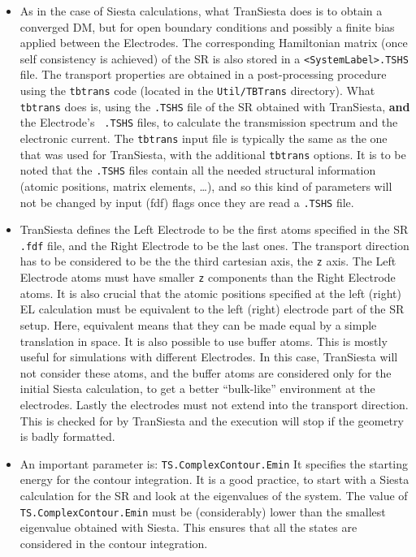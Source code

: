 \documentclass[11pt]{article}
\begin{document}
\begin{itemize}
\item
As in the case of {\sc Siesta} calculations, what {\sc TranSiesta}
does is to obtain a converged DM, but for open boundary conditions and
possibly a finite bias applied between the Electrodes. The
corresponding Hamiltonian matrix (once self consistency is achieved)
of the SR is also stored in a {\tt <SystemLabel>.TSHS} file. The
transport properties are obtained in a post-processing procedure using
the {\tt tbtrans} code (located in the {\tt Util/TBTrans}
directory). What {\tt tbtrans} does is, using the {\tt .TSHS} file of
the SR obtained with {\sc TranSiesta}, {\bf and} the Electrode's {\tt
  .TSHS} files, to calculate the transmission spectrum and the
electronic current. The {\tt tbtrans} input file is typically the same
as the one that was used for {\sc TranSiesta}, with the additional
{\tt tbtrans} options. It is to be noted that the {\tt .TSHS} files
contain all the needed structural information (atomic positions,
matrix elements, \ldots), and so this kind of parameters will not be
changed by input (fdf) flags once they are read a {\tt .TSHS} file.

\item
{\sc TranSiesta} defines the Left Electrode to be the first atoms
specified in the SR {\tt .fdf} file, and the Right Electrode to be the
last ones. The transport direction has to be considered to be the the
third cartesian axis, the {\tt z} axis. The Left Electrode atoms must
have smaller {\tt z} components than the Right Electrode atoms. It is
also crucial that the atomic positions specified at the left (right)
EL calculation must be equivalent to the left (right) electrode part
of the SR setup. Here, equivalent means that they can be made equal by
a simple translation in space. It is also possible to use buffer
atoms. This is mostly useful for simulations with different
Electrodes.  In this case, {\sc TranSiesta} will not consider these
atoms, and the buffer atoms are considered only for the initial {\sc
  Siesta} calculation, to get a better ``bulk-like'' environment at
the electrodes.
Lastly the electrodes must not extend into the transport direction.
This is checked for by {\sc TranSiesta} and the execution will stop
if the geometry is badly formatted.

\item
An important parameter is: {\tt TS.ComplexContour.Emin} It specifies
the starting energy for the contour integration. It is a good
practice, to start with a {\sc Siesta} calculation for the SR and look
at the eigenvalues of the system. The value of {\tt
  TS.ComplexContour.Emin} must be (considerably) lower than the
smallest eigenvalue obtained with {\sc Siesta}. This ensures that all
the states are considered in the contour integration.


\end{itemize}
\end{document}
